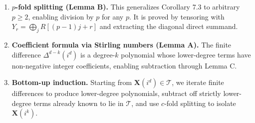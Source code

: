 \documentclass[11pt]{article}
\newcommand{\XX}{\mathbf{X}}
\newcommand{\TT}{\mathcal{T}}
\begin{document}
\begin{enumerate}
\item \textbf{$p$-fold splitting (Lemma B).} This generalizes Corollary 7.3 to arbitrary $p \geqslant 2$, enabling division by $p$ for any $p$. It is proved by tensoring with $Y_r=\bigoplus_j R[(p-1)j+r]$ and extracting the diagonal direct summand.
\item \textbf{Coefficient formula via Stirling numbers (Lemma A).} The finite difference $\Delta^{d-k}(i^d)$ is a degree-$k$ polynomial whose lower-degree terms have non-negative integer coefficients, enabling subtraction through Lemma C.
\item \textbf{Bottom-up induction.} Starting from $\XX(i^d)\in\TT$, we iterate finite differences to produce lower-degree polynomials, subtract off strictly lower-degree terms already known to lie in $\TT$, and use $c$-fold splitting to isolate $\XX(i^k)$.
\end{enumerate}
\end{document}
